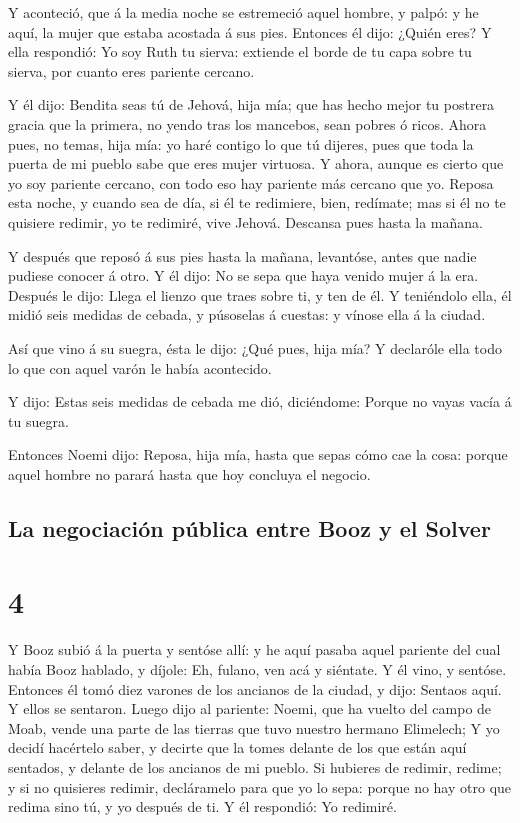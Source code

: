  Y aconteció, que á la media noche se estremeció aquel
hombre, y palpó: y he aquí, la mujer que estaba acostada á sus pies.
 Entonces él dijo: ¿Quién eres? Y ella respondió: Yo soy
Ruth tu sierva: extiende el borde de tu capa sobre tu sierva, por cuanto
eres pariente cercano.

 Y él dijo: Bendita seas tú de Jehová, hija mía; que has
hecho mejor tu postrera gracia que la primera, no yendo tras los
mancebos, sean pobres ó ricos.  Ahora pues, no temas,
hija mía: yo haré contigo lo que tú dijeres, pues que toda la puerta de
mi pueblo sabe que eres mujer virtuosa.  Y ahora, aunque
es cierto que yo soy pariente cercano, con todo eso hay pariente más
cercano que yo.  Reposa esta noche, y cuando sea de día,
si él te redimiere, bien, redímate; mas si él no te quisiere redimir, yo
te redimiré, vive Jehová. Descansa pues hasta la mañana.

 Y después que reposó á sus pies hasta la mañana,
levantóse, antes que nadie pudiese conocer á otro. Y él dijo: No se sepa
que haya venido mujer á la era.  Después le dijo: Llega
el lienzo que traes sobre ti, y ten de él. Y teniéndolo ella, él midió
seis medidas de cebada, y púsoselas á cuestas: y vínose ella á la
ciudad.

 Así que vino á su suegra, ésta le dijo: ¿Qué pues, hija
mía? Y declaróle ella todo lo que con aquel varón le había acontecido.

 Y dijo: Estas seis medidas de cebada me dió, diciéndome:
Porque no vayas vacía á tu suegra.

 Entonces Noemi dijo: Reposa, hija mía, hasta que sepas
cómo cae la cosa: porque aquel hombre no parará hasta que hoy concluya
el negocio.

\hypertarget{la-negociaciuxf3n-puxfablica-entre-booz-y-el-solver}{%
\subsection{La negociación pública entre Booz y el
Solver}\label{la-negociaciuxf3n-puxfablica-entre-booz-y-el-solver}}

\hypertarget{section-08-4}{%
\section{4}\label{section-08-4}}

 Y Booz subió á la puerta y sentóse allí: y he aquí pasaba
aquel pariente del cual había Booz hablado, y díjole: Eh, fulano, ven
acá y siéntate. Y él vino, y sentóse.  Entonces él tomó
diez varones de los ancianos de la ciudad, y dijo: Sentaos aquí. Y ellos
se sentaron.  Luego dijo al pariente: Noemi, que ha vuelto
del campo de Moab, vende una parte de las tierras que tuvo nuestro
hermano Elimelech;  Y yo decidí hacértelo saber, y decirte
que la tomes delante de los que están aquí sentados, y delante de los
ancianos de mi pueblo. Si hubieres de redimir, redime; y si no quisieres
redimir, decláramelo para que yo lo sepa: porque no hay otro que redima
sino tú, y yo después de ti. Y él respondió: Yo redimiré.

